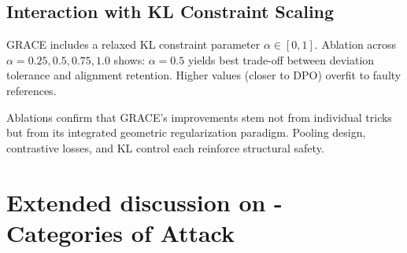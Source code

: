 \subsection{Interaction with KL Constraint Scaling}
GRACE includes a relaxed KL constraint parameter \(\alpha \in [0,1]\). Ablation across \(\alpha=0.25, 0.5, 0.75, 1.0\) shows:\newline
\textbf{\(\alpha=0.5\)} yields best trade-off between deviation tolerance and alignment retention. Higher values (closer to DPO) overfit to faulty references.

Ablations confirm that GRACE's improvements stem not from individual tricks but from its integrated geometric regularization paradigm. Pooling design, contrastive losses, and KL control each reinforce structural safety.






































































\clearpage
\onecolumn





\section{Extended discussion on - Categories of Attack}
\label{sec:appendix_extended_categories_of_attack}

